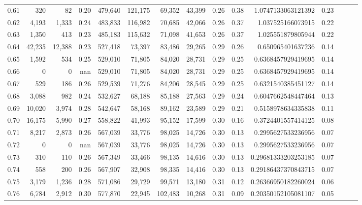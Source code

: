 \begin{tabular}{rrrrrrrrrrrrrrr}
0.61 &     320 &      82 &  0.20 &  479,640 &  121,175 &   69,352 &   43,399 &  0.26 &  0.38 &    1.0747133063121392 &      0.23 \\
0.62 &   4,193 &   1,333 &  0.24 &  483,833 &  116,982 &   70,685 &   42,066 &  0.26 &  0.37 &     1.037525166073915 &      0.22 \\
0.63 &   1,350 &     413 &  0.23 &  485,183 &  115,632 &   71,098 &   41,653 &  0.26 &  0.37 &     1.025551879805944 &      0.22 \\
0.64 &  42,235 &  12,388 &  0.23 &  527,418 &   73,397 &   83,486 &   29,265 &  0.29 &  0.26 &     0.650965401637236 &      0.14 \\
0.65 &   1,592 &     534 &  0.25 &  529,010 &   71,805 &   84,020 &   28,731 &  0.29 &  0.25 &    0.6368457929419695 &      0.14 \\
0.66 &       0 &       0 &   nan &  529,010 &   71,805 &   84,020 &   28,731 &  0.29 &  0.25 &    0.6368457929419695 &      0.14 \\
0.67 &     529 &     186 &  0.26 &  529,539 &   71,276 &   84,206 &   28,545 &  0.29 &  0.25 &    0.6321540385451127 &      0.14 \\
0.68 &   3,088 &     982 &  0.24 &  532,627 &   68,188 &   85,188 &   27,563 &  0.29 &  0.24 &    0.6047662548447464 &      0.13 \\
0.69 &  10,020 &   3,974 &  0.28 &  542,647 &   58,168 &   89,162 &   23,589 &  0.29 &  0.21 &    0.5158978634335838 &      0.11 \\
0.70 &  16,175 &   5,990 &  0.27 &  558,822 &   41,993 &   95,152 &   17,599 &  0.30 &  0.16 &    0.3724401557414125 &      0.08 \\
0.71 &   8,217 &   2,873 &  0.26 &  567,039 &   33,776 &   98,025 &   14,726 &  0.30 &  0.13 &    0.2995627533236956 &      0.07 \\
0.72 &       0 &       0 &   nan &  567,039 &   33,776 &   98,025 &   14,726 &  0.30 &  0.13 &    0.2995627533236956 &      0.07 \\
0.73 &     310 &     110 &  0.26 &  567,349 &   33,466 &   98,135 &   14,616 &  0.30 &  0.13 &   0.29681333203253185 &      0.07 \\
0.74 &     558 &     200 &  0.26 &  567,907 &   32,908 &   98,335 &   14,416 &  0.30 &  0.13 &   0.29186437370843715 &      0.07 \\
0.75 &   3,179 &   1,236 &  0.28 &  571,086 &   29,729 &   99,571 &   13,180 &  0.31 &  0.12 &   0.26366950182260024 &      0.06 \\
0.76 &   6,784 &   2,912 &  0.30 &  577,870 &   22,945 &  102,483 &   10,268 &  0.31 &  0.09 &   0.20350152105081107 &      0.05 \\

\end{tabular}
